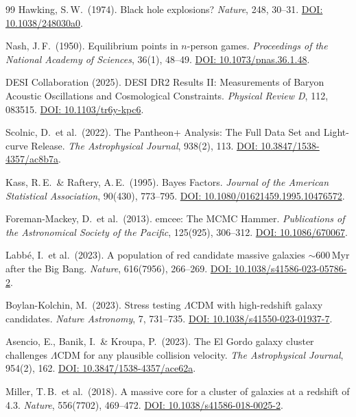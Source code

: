\documentclass[aps,prd,twocolumn,superscriptaddress,nofootinbib]{revtex4-2}
\begin{document}
\begin{thebibliography}{99}
Hawking, S.\,W.\ (1974).
Black hole explosions?
\textit{Nature}, 248, 30--31.
\href{https://doi.org/10.1038/248030a0}{DOI: 10.1038/248030a0}.

Nash, J.\,F.\ (1950).
Equilibrium points in $n$-person games.
\textit{Proceedings of the National Academy of Sciences}, 36(1), 48--49.
\href{https://doi.org/10.1073/pnas.36.1.48}{DOI: 10.1073/pnas.36.1.48}.

DESI Collaboration (2025).
DESI DR2 Results II: Measurements of Baryon Acoustic Oscillations and Cosmological Constraints.
\textit{Physical Review D}, 112, 083515.
\href{https://doi.org/10.1103/tr6y-kpc6}{DOI: 10.1103/tr6y-kpc6}.

Scolnic, D.\ et al.\ (2022).
The Pantheon+ Analysis: The Full Data Set and Light-curve Release.
\textit{The Astrophysical Journal}, 938(2), 113.
\href{https://doi.org/10.3847/1538-4357/ac8b7a}{DOI: 10.3847/1538-4357/ac8b7a}.

Kass, R.\,E.\ \& Raftery, A.\,E.\ (1995).
Bayes Factors.
\textit{Journal of the American Statistical Association}, 90(430), 773--795.
\href{https://doi.org/10.1080/01621459.1995.10476572}{DOI: 10.1080/01621459.1995.10476572}.

Foreman-Mackey, D.\ et al.\ (2013).
emcee: The MCMC Hammer.
\textit{Publications of the Astronomical Society of the Pacific}, 125(925), 306--312.
\href{https://doi.org/10.1086/670067}{DOI: 10.1086/670067}.

Labb\'e, I.\ et al.\ (2023).
A population of red candidate massive galaxies $\sim$600\,Myr after the Big Bang.
\textit{Nature}, 616(7956), 266--269.
\href{https://doi.org/10.1038/s41586-023-05786-2}{DOI: 10.1038/s41586-023-05786-2}.

Boylan-Kolchin, M.\ (2023).
Stress testing $\Lambda$CDM with high-redshift galaxy candidates.
\textit{Nature Astronomy}, 7, 731--735.
\href{https://doi.org/10.1038/s41550-023-01937-7}{DOI: 10.1038/s41550-023-01937-7}.

Asencio, E., Banik, I.\ \& Kroupa, P.\ (2023).
The El Gordo galaxy cluster challenges $\Lambda$CDM for any plausible collision velocity.
\textit{The Astrophysical Journal}, 954(2), 162.
\href{https://doi.org/10.3847/1538-4357/ace62a}{DOI: 10.3847/1538-4357/ace62a}.

Miller, T.\,B.\ et al.\ (2018).
A massive core for a cluster of galaxies at a redshift of 4.3.
\textit{Nature}, 556(7702), 469--472.
\href{https://doi.org/10.1038/s41586-018-0025-2}{DOI: 10.1038/s41586-018-0025-2}.


\end{thebibliography}
\end{document}
